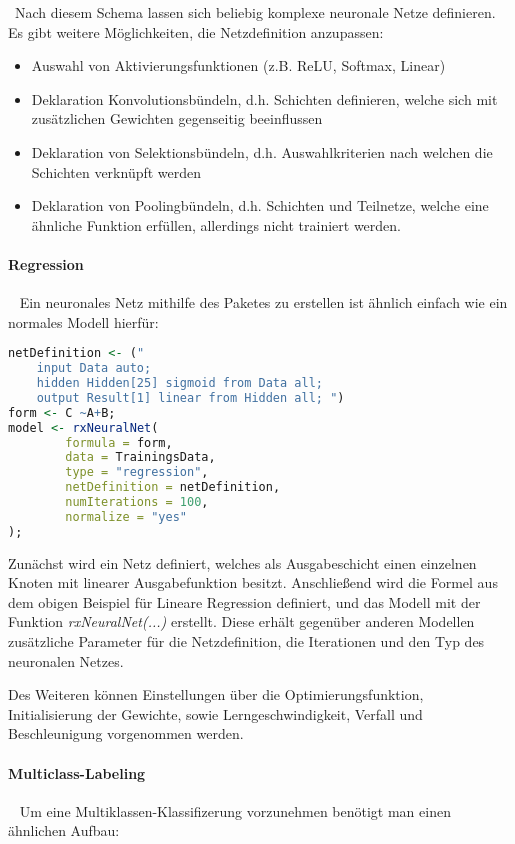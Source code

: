 ~\newline Nach diesem Schema lassen sich beliebig komplexe neuronale Netze definieren. Es gibt weitere Möglichkeiten, die Netzdefinition anzupassen:

\begin{itemize}
	\item Auswahl von Aktivierungsfunktionen (z.B. ReLU, Softmax, Linear)
	\item Deklaration Konvolutionsbündeln, d.h. Schichten definieren, welche sich mit zusätzlichen Gewichten gegenseitig beeinflussen
	\item Deklaration von Selektionsbündeln, d.h. Auswahlkriterien nach welchen die Schichten verknüpft werden
	\item Deklaration von Poolingbündeln, d.h. Schichten und Teilnetze, welche eine ähnliche Funktion erfüllen, allerdings nicht trainiert werden. 
\end{itemize} 

\paragraph{Regression} ~\newline
Ein neuronales Netz mithilfe des Paketes zu erstellen ist ähnlich einfach wie ein normales Modell hierfür:

\begin{lstlisting}[language=R]
netDefinition <- ("
	input Data auto;
	hidden Hidden[25] sigmoid from Data all;
	output Result[1] linear from Hidden all; ")
form <- C ~A+B;
model <- rxNeuralNet(
		formula = form, 
		data = TrainingsData,              
		type = "regression",
		netDefinition = netDefinition,
		numIterations = 100,
		normalize = "yes"
);
\end{lstlisting}

Zunächst wird ein Netz definiert, welches als Ausgabeschicht einen einzelnen Knoten mit linearer Ausgabefunktion besitzt. Anschließend wird die Formel aus dem obigen Beispiel für Lineare Regression definiert, und das Modell mit der Funktion \textit{rxNeuralNet(...)} erstellt. Diese erhält gegenüber anderen Modellen zusätzliche Parameter für die Netzdefinition, die Iterationen und den Typ des neuronalen Netzes. 

Des Weiteren können Einstellungen über die Optimierungsfunktion, Initialisierung der Gewichte, sowie Lerngeschwindigkeit, Verfall und Beschleunigung vorgenommen werden.

\paragraph{Multiclass-Labeling} ~\newline
Um eine Multiklassen-Klassifizerung vorzunehmen benötigt man einen ähnlichen Aufbau:


